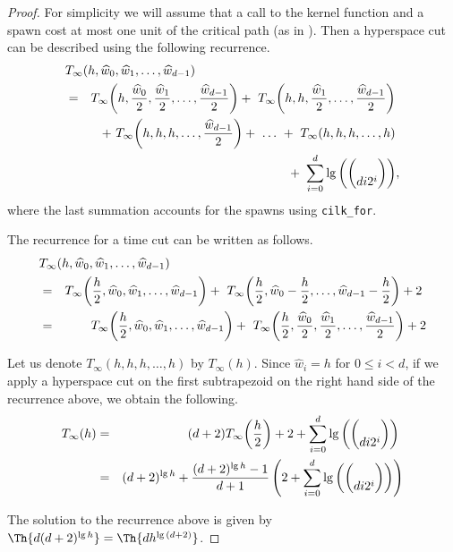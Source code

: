 \begin{proof}
%
For simplicity we will assume that a call to 
the kernel function and a spawn cost at most one unit 
of the critical path (as in \cite{FrigoSt09}).
%
Then a hyperspace cut can be described using
the following recurrence.
%
\begin{eqnarray*}
\lefteqn{T_{\infty}(h, {\widehat{w}}_0, {\widehat{w}}_1, \ldots, {\widehat{w}}_{d - 1})}\\
& = & T_{\infty}{\left(h, {{\widehat{w}}_0 \over 2}, {{\widehat{w}}_1 \over 2}, \ldots, 
{{\widehat{w}}_{d - 1} \over 2}\right)}
+~ T_{\infty}{\left(h, h, {{\widehat{w}}_1 \over 2}, \ldots, 
{{\widehat{w}}_{d - 1} \over 2}\right)}~\\
& & +~ T_{\infty}{\left(h, h, h, \ldots, 
{{\widehat{w}}_{d - 1} \over 2}\right)}
+~ \ldots ~+~ T_{\infty}{\left(h, h, h, \ldots, h\right)}~\\
& & +~ \sum_{i = 0}^{d}{\lg{\left( \choose{d}{i} 2^i \right)}},
\end{eqnarray*}
%
where the last summation accounts for the spawns using {\tt cilk\_for}.

The recurrence for a time cut can be written
as follows.
%
\begin{eqnarray*}
\lefteqn{T_{\infty}(h, {\widehat{w}}_0, {\widehat{w}}_1, \ldots, {\widehat{w}}_{d - 1})}\\
& = & T_{\infty}{\left(\frac{h}{2}, {\widehat{w}}_0, {\widehat{w}}_1, \ldots, {\widehat{w}}_{d - 1}\right)}
+~ T_{\infty}{\left(\frac{h}{2}, {\widehat{w}}_0 - {h \over 2}, \ldots, 
{\widehat{w}}_{d - 1} - {h \over 2}\right)} + 2~\\
& = & T_{\infty}{\left(\frac{h}{2}, {\widehat{w}}_0, {\widehat{w}}_1, \ldots, {\widehat{w}}_{d - 1}\right)}
 +~ T_{\infty}{\left(\frac{h}{2}, {{\widehat{w}}_0 \over 2}, {{\widehat{w}}_1 \over 2}, \ldots, 
{{\widehat{w}}_{d - 1} \over 2}\right)} + 2
\end{eqnarray*}

Let us denote $T_{\infty}{\left(h, h, h, \ldots, h\right)}$ by
$T_{\infty}{\left(h\right)}$. Since ${\widehat{w}}_i = h$
for $0 \leq i < d$, if we apply a hyperspace cut on
the first subtrapezoid on the right hand side of the
recurrence above, we obtain the following.
%
\begin{eqnarray*}
T_{\infty}{\left(h\right)} 
& = & ( d + 2 ) T_{\infty}{\left({h \over 2}\right)}
+ 2 + \sum_{i = 0}^{d}{\lg{\left( \choose{d}{i} 2^i \right)}}~\\
& = & ( d + 2 )^{ \lg{ h } } + { { ( d + 2 )^{ \lg{ h } } - 1 } \over { d + 1 } } \left( 2 + \sum_{i = 0}^{d}{\lg{\left( \choose{d}{i} 2^i \right)}} \right)
\end{eqnarray*}

The solution to the recurrence above is given by
$\Th{d (d + 2)^{\lg{h}}} = \Th{ dh^{\lg{( d + 2)}} }$.
%
\end{proof}

